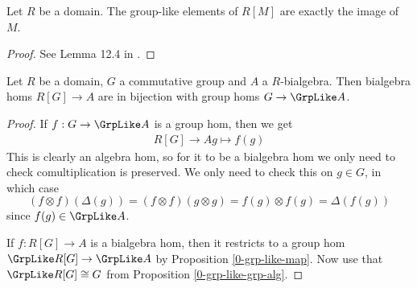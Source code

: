 \begin{lemma}
  \label{0-grp-like-grp-alg}
  \leanok

  Let $R$ be a domain.
  The group-like elements of $R[M]$ are exactly the image of $M$.
\end{lemma}
\begin{proof}
  \leanok

  See Lemma 12.4 in \cite{Milne_2017}.
\end{proof}


\begin{proposition}
  \label{0-grp-alg-grp-like-gc}

  Let $R$ be a domain, $G$ a commutative group and $A$ a $R$-bialgebra.
  Then bialgebra homs $R[G] \to A$ are in bijection with group homs $G \to \GrpLike A$.
\end{proposition}
\begin{proof}

  If $f : G \to \GrpLike A$ is a group hom, then we get
  \begin{align*}
    R[G] \to A
    g \mapsto f(g)
  \end{align*}
  This is clearly an algebra hom,
  so for it to be a bialgebra hom we only need to check comultiplication is preserved.
  We only need to check this on $g \in G$, in which case
  \[(f \otimes f)(\Delta(g)) = (f \otimes f)(g \otimes g) = f(g) \otimes f(g) = \Delta(f(g))\]
  since $f(g) \in \GrpLike A$.

  If $f : R[G] \to A$ is a bialgebra hom,
  then it restricts to a group hom $\GrpLike R[G] \to \GrpLike A$
  by Proposition \ref{0-grp-like-map}.
  Now use that $\GrpLike R[G] \cong G$ from Proposition \ref{0-grp-like-grp-alg}.
\end{proof}


